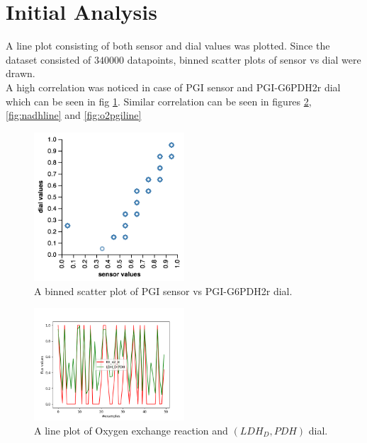 \documentclass[12pt,chapterheads]{ucsd}
\begin{document}
\section{Initial Analysis} \label{sec:initial Analysis}
A line plot consisting of both sensor and dial values was plotted. Since the dataset consisted of $340000$ datapoints, binned scatter plots of sensor vs dial were drawn. \\
A high correlation was noticed in case of PGI sensor and PGI-G6PDH2r dial which can be seen in fig \ref{fig:binned}. Similar correlation can be seen in figures \ref{fig:o2ldhline}, \ref{fig:nadhline} and \ref{fig:o2pgiline}

\begin{figure}[h] 
\centering
\includegraphics[width=0.5\textwidth]{Figures/PGI_sensor_PGI_G6PDH2r}
\caption[Binned scatter plot of PGI sensor vs PGI-G6PDH2r dial]
{A binned scatter plot of PGI sensor vs PGI-G6PDH2r dial.}
\label{fig:binned}
\end{figure}

\begin{figure}[h] 
\centering
\includegraphics[width=0.5\textwidth]{Figures/EX_o2_e_LDH_D_PDH_lineplot_50}
\caption[EX\textunderscore o2 \textunderscore c with LDH \textunderscore D - PDH line plot]
{A line plot of Oxygen exchange reaction and $(LDH_D, PDH)$  dial.}
\label{fig:o2ldhline}
\end{figure}
\end{document}

